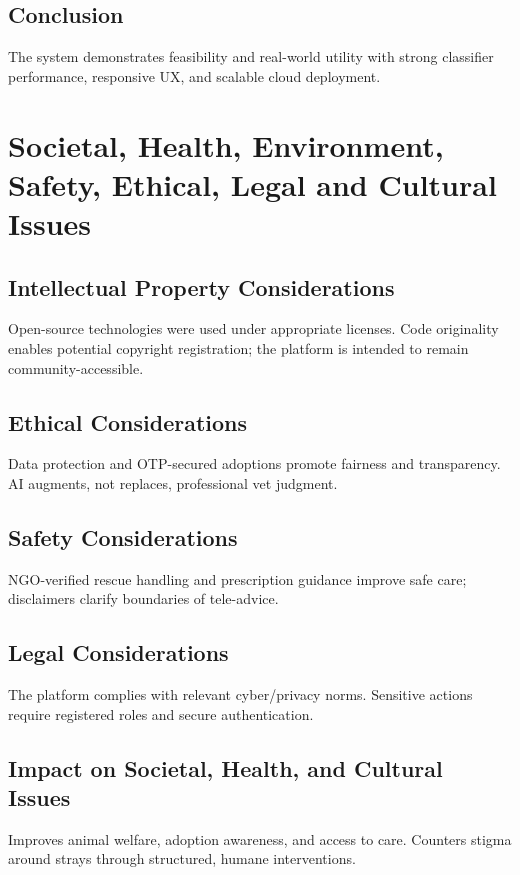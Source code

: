 \documentclass[12pt,a4paper]{report}
\numberwithin{figure}{chapter}
\numberwithin{table}{chapter}
\begin{document}
\section{Conclusion}
The system demonstrates feasibility and real-world utility with strong classifier performance, responsive UX, and scalable cloud deployment.

\chapter{Societal, Health, Environment, Safety, Ethical, Legal and Cultural Issues}\label{chap:issues}

\section{Intellectual Property Considerations}
Open-source technologies were used under appropriate licenses. Code originality enables potential copyright registration; the platform is intended to remain community-accessible.

\section{Ethical Considerations}
Data protection and OTP-secured adoptions promote fairness and transparency. AI augments, not replaces, professional vet judgment.

\section{Safety Considerations}
NGO-verified rescue handling and prescription guidance improve safe care; disclaimers clarify boundaries of tele-advice.

\section{Legal Considerations}
The platform complies with relevant cyber/privacy norms. Sensitive actions require registered roles and secure authentication.

\section{Impact on Societal, Health, and Cultural Issues}
Improves animal welfare, adoption awareness, and access to care. Counters stigma around strays through structured, humane interventions.
\end{document}
